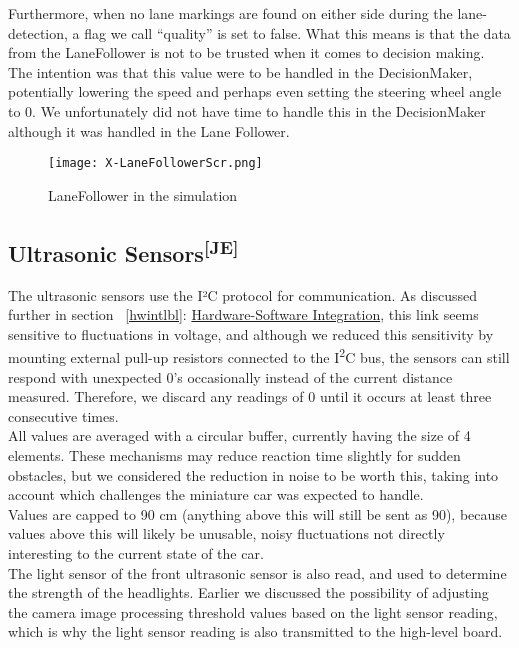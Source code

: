 \noindent
Furthermore, when no lane markings are found on either side during the
lane-detection, a flag we call “quality” is set to false. What this means is
that the data from the LaneFollower is not to be trusted when it comes to
decision making. The intention was that this value were to be handled in the
DecisionMaker, potentially lowering the speed and perhaps even setting the
steering wheel angle to 0. We unfortunately did not have time to handle this in
the DecisionMaker although it was handled in the Lane Follower.
\begin{figure}[ht]
  \centering
  \texttt{[image: X-LaneFollowerScr.png]}
  \caption{LaneFollower in the simulation}
  \label{lfsim}
\end{figure}


\newpage
\subsection[Ultrasonic Sensors]{Ultrasonic Sensors\textsuperscript{[JE]}}
The ultrasonic sensors use the I²C protocol for communication. As discussed
further in section ~\ref{hwintlbl}: \hyperlink{hwinttgt}{Hardware-Software
Integration}, this link seems sensitive to fluctuations in voltage,
and although we reduced this sensitivity by mounting external pull-up resistors
connected to the I\textsuperscript{2}C bus, the sensors can still respond with
unexpected 0's occasionally instead of the current distance measured. Therefore,
we discard any readings of 0 until it occurs at least three consecutive times.\\

\noindent
All values are averaged with a circular buffer, currently having the size of 4
elements. These mechanisms may reduce reaction time slightly for sudden
obstacles, but we considered the reduction in noise to be worth this, taking
into account which challenges the miniature car was expected to handle.\\

\noindent
Values are capped to 90 cm (anything above this will still be sent as 90),
because values above this will likely be unusable, noisy fluctuations not
directly interesting to the current state of the car.\\

\noindent
The light sensor of the front ultrasonic sensor is also read, and used to
determine the strength of the headlights. Earlier we discussed the possibility
of adjusting the camera image processing threshold values based on the light
sensor reading, which is why the light sensor reading is also transmitted to the
high-level board.

